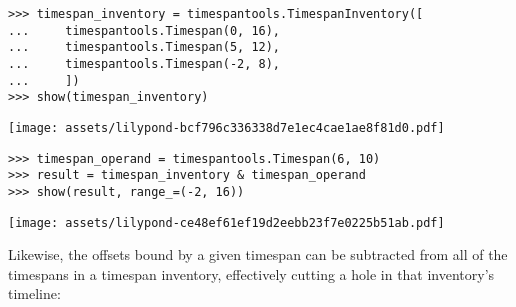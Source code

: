 \begin{comment}
<abjad>
timespan_inventory = timespantools.TimespanInventory([
    timespantools.Timespan(0, 16),
    timespantools.Timespan(5, 12),
    timespantools.Timespan(-2, 8),
    ])
show(timespan_inventory)
timespan_operand = timespantools.Timespan(6, 10)
result = timespan_inventory & timespan_operand
show(result, range_=(-2, 16))
</abjad>
\end{comment}

\begin{abjadbookoutput}
\begin{singlespacing}
\vspace{-0.5\baselineskip}
\begin{verbatim}
>>> timespan_inventory = timespantools.TimespanInventory([
...     timespantools.Timespan(0, 16),
...     timespantools.Timespan(5, 12),
...     timespantools.Timespan(-2, 8),
...     ])
>>> show(timespan_inventory)
\end{verbatim}
\noindent\texttt{[image: assets/lilypond-bcf796c336338d7e1ec4cae1ae8f81d0.pdf]}
\begin{verbatim}
>>> timespan_operand = timespantools.Timespan(6, 10)
>>> result = timespan_inventory & timespan_operand
>>> show(result, range_=(-2, 16))
\end{verbatim}
\noindent\texttt{[image: assets/lilypond-ce48ef61ef19d2eebb23f7e0225b51ab.pdf]}
\end{singlespacing}
\end{abjadbookoutput}

\noindent Likewise, the offsets bound by a given timespan can be subtracted
from all of the timespans in a timespan inventory, effectively cutting a hole
in that inventory's timeline:

\begin{comment}
<abjad>
timespan_inventory = timespantools.TimespanInventory([
    timespantools.Timespan(0, 16),
    timespantools.Timespan(5, 12),
    timespantools.Timespan(-2, 8),
    ])
show(timespan_inventory)
timespan_operand = timespantools.Timespan(6, 10)
result = timespan_inventory - timespan_operand
show(result)
</abjad>
\end{comment}

